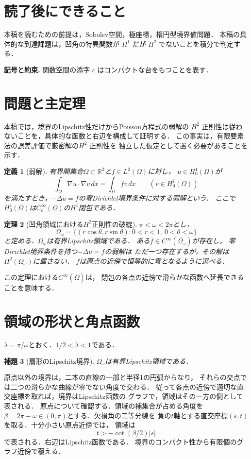 \documentclass[a5paper,10pt,onecolumn]{jsarticle}
\makeatletter
\theoremstyle{mathnotetheorem}
\newtheorem{theorem}{定理}[section]
\newtheorem{definition}[theorem]{定義}
\newtheorem{lemma}[theorem]{補題}
\renewcommand{\proofname}{証明}
\renewenvironment{proof}[1][\proofname]{%
  \par\pushQED{\qed}\normalfont\topsep4\p@\@plus2\p@\relax
  \trivlist\item[\hskip\labelsep\bfseries #1]\ignorespaces
}{\popQED\endtrivlist\@endpefalse}
\makeatother
\begin{document}
\section*{読了後にできること}
本稿を読むための前提は，Sobolev空間，極座標，楕円型境界値問題．
本稿の具体的な到達課題は，凹角の特異関数が $H^1$ だが $H^2$ でないことを積分で判定する．


\par\noindent\textbf{記号と約束.}\quad
関数空間の添字 $c$ はコンパクトな台をもつことを表す．
\par

\section{問題と主定理}
本稿では，境界のLipschitz性だけからPoisson方程式の弱解の
$H^2$ 正則性は従わないことを，具体的な函数と右辺を構成して証明する．
この事実は，有限要素法の誤差評価で厳密解の$H^2$ 正則性を
独立した仮定として置く必要があることを示す．

\begin{definition}[弱解]
有界開集合$\Omega\subset\mathbb R^2$と$f\in L^2(\Omega)$に対し，
$u\in H_0^1(\Omega)$が
\[
 \int_\Omega\nabla u\cdot\nabla v\,dx
   =\int_\Omega fv\,dx
 \qquad(v\in H_0^1(\Omega))
\]
を満たすとき，$-\Delta u=f$の零Dirichlet境界条件に対する弱解という．
ここで$H_0^1(\Omega)$は$C_c^\infty(\Omega)$の$H^1$閉包である．
\end{definition}

\begin{theorem}[凹角領域における$H^2$正則性の破綻]\label{thm:corner}
$\pi<\omega<2\pi$とし，
\[
 \Omega_\omega=
 \{(r\cos\theta,r\sin\theta):0<r<1,\ 0<\theta<\omega\}
\]
と定める．$\Omega_\omega$は有界Lipschitz領域である．
ある$f\in C^\infty(\overline{\Omega_\omega})$が存在し，
零Dirichlet境界条件を持つ$-\Delta u=f$の弱解は
ただ一つ存在するが，その解は$H^2(\Omega_\omega)$に属さない．
$f$は原点の近傍で恒等的に零となるように選べる．
\end{theorem}

この定理における$C^\infty(\overline\Omega)$は，
閉包の各点の近傍で滑らかな函数へ延長できることを意味する．

\section{領域の形状と角点函数}
$\lambda=\pi/\omega$とおく．$1/2<\lambda<1$である．

\begin{lemma}[扇形のLipschitz境界]\label{lem:lipschitz}
$\Omega_\omega$は有界Lipschitz領域である．
\end{lemma}
\begin{proof}
原点以外の境界は，二本の直線の一部と半径1の円弧からなり，
それらの交点では二つの滑らかな曲線が零でない角度で交わる．
従って各点の近傍で適切な直交座標を取れば，境界はLipschitz函数の
グラフで，領域はその一方の側として表される．
原点について確認する．領域の補集合が占める角度を
$\beta=2\pi-\omega\in(0,\pi)$とする．欠損角の二等分線を
負の$t$軸とする直交座標$(s,t)$を取る．十分小さい原点近傍では，
領域は
\[
 t>-\cot(\beta/2)|s|
\]
で表される．右辺はLipschitz函数である．
境界のコンパクト性から有限個のグラフ近傍で覆える．
\end{proof}
\end{document}
